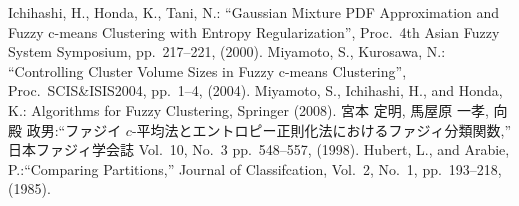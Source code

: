 \documentclass[twocolumn, a4paper]{icethesisabst}
\begin{document}
\begin{thebibliography}{5}
Ichihashi, H., Honda, K., Tani, N.: ``Gaussian Mixture PDF Approximation and Fuzzy c-means Clustering with Entropy Regularization'', Proc.~4th Asian Fuzzy System Symposium, pp.~217--221, (2000).
Miyamoto, S., Kurosawa, N.: ``Controlling Cluster Volume Sizes in Fuzzy c-means Clustering'', Proc.~SCIS\&ISIS2004, pp.~1--4, (2004).
Miyamoto, S., Ichihashi, H., and Honda, K.: Algorithms for Fuzzy Clustering, Springer (2008).
宮本 定明, 馬屋原 一孝, 向殿 政男:``ファジイ $c$-平均法とエントロピー正則化法におけるファジィ分類関数,''  日本ファジィ学会誌 Vol.~10, No.~3  pp.~548--557, (1998).
 Hubert, L., and Arabie, P.:``Comparing Partitions,'' Journal of Classifcation, Vol.~2, No.~1,
pp.~193--218, (1985).
\end{thebibliography}
\end{document}
